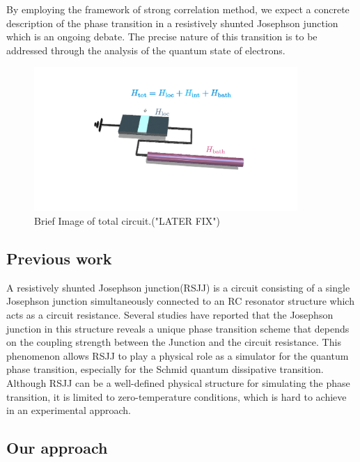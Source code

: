 \documentclass{article}[12pt]
\numberwithin{equation}{section}
\begin{document}
\begin{spacing}{1.5}
By employing the framework of strong correlation method, we expect a concrete description of the phase transition in a resistively shunted Josephson junction which is an ongoing debate. The precise nature of this transition is to be addressed through the analysis of the quantum state of electrons.
\begin{figure}[htbp]
  \centerline{\includegraphics[width=10cm]{TexFigure/kps_create_junction.png}}
  \caption{Brief Image of total circuit.("LATER FIX")}
\end{figure}

\pagebreak
\subsection{Previous work}

A resistively shunted Josephson junction(RSJJ) is a circuit consisting of a single Josephson junction simultaneously connected to an RC resonator structure which acts as a circuit resistance. Several studies have reported that the Josephson junction in this structure reveals a unique phase transition scheme that depends on the coupling strength between the Junction and the circuit resistance. This phenomenon allows RSJJ to play a physical role as a simulator for the quantum phase transition, especially for the Schmid quantum dissipative transition. Although RSJJ can be a well-defined physical structure for simulating the phase transition, it is limited to zero-temperature conditions, which is hard to achieve in an experimental approach.

\subsection{Our approach}


\end{spacing}
\end{document}

